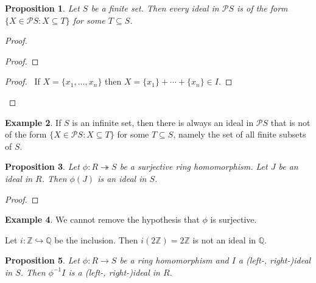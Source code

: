\documentclass{book}
\let\qed\relax
\newtheorem{prop}{Proposition}[chapter]
\theoremstyle{definition}
\newtheorem{ex}[prop]{Example}
\newcommand{\inv}[1]{\ensuremath{{#1}^{-1}}}
\begin{document}
\begin{prop}
Let $S$ be a finite set. Then every ideal in $\mathcal{P} S$ is of the form $\{ X \in \mathcal{P} S : X \subseteq T \}$ for some $T \subseteq S$.
\end{prop}

\begin{proof}
\pf
{}
\begin{proof}
\end{proof}
\begin{proof}
	\pf\ If $X = \{x_1, \ldots, x_n\}$ then $X = \{x_1\} + \cdots + \{x_n\} \in I$.
\end{proof}
\qed
\end{proof}

\begin{ex}
If $S$ is an infinite set, then there is always an ideal in $\mathcal{P} S$ that is not of the form $\{X \in \mathcal{P} S : X \subseteq T \}$ for some $T \subseteq S$, namely the set of all finite subsets of $S$.
\end{ex}

\begin{prop}
Let $\phi : R \twoheadrightarrow S$ be a surjective ring homomorphism. Let $J$ be an ideal in $R$. Then $\phi(J)$ is an ideal in $S$.
\end{prop}

\begin{proof}
\pf
{}
\qed
\end{proof}

\begin{ex}
We cannot remove the hypothesis that $\phi$ is surjective.

Let $i : \mathbb{Z} \hookrightarrow \mathbb{Q}$ be the inclusion. Then $i(2 \mathbb{Z}) = 2 \mathbb{Z}$ is not an ideal in $\mathbb{Q}$.
\end{ex}

\begin{prop}
Let $\phi : R \rightarrow S$ be a ring homomorphism and $I$ a (left-, right-)ideal in $S$. Then $\inv{\phi}{I}$ is a (left-, right-)ideal in $R$.
\end{prop}
\end{document}
